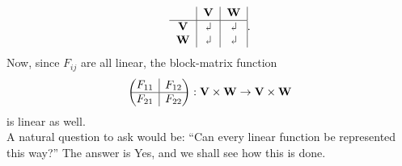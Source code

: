 \documentclass{article}
\theoremstyle{definition}
\newcommand{\V}{\mathbf{V}}
\newcommand{\W}{\mathbf{W}}
\newcommand{\gives}{\rotatebox[origin=c]{180}{$\Rsh$}	}
\newcommand{\rvline}{\hspace*{-\arraycolsep}\vline\hspace*{-\arraycolsep}}
\begin{document}
\begin{align*}
\begin{tabular}{c|c|c|}
	& $\V$ & $\W$\\
	\hline
$\V$& $\gives$& $\gives$\\	
$\W$& $\gives$ & $\gives$
\end{tabular}.
\end{align*}
Now, since $F_{ij}$ are all linear, the block-matrix function 
\begin{align*}
\begin{pmatrix}
\begin{matrix}
F_{11}
\end{matrix}
& \rvline & F_{12} \\
\hline
F_{21} & \rvline &
F_{22}
\end{pmatrix} : \V \times \W \to \V \times \W
\end{align*}
is linear as well. \\

A natural question to ask would be: ``Can every linear function be represented this way?'' The answer is Yes, and we shall see how this is done. \\
\end{document}
